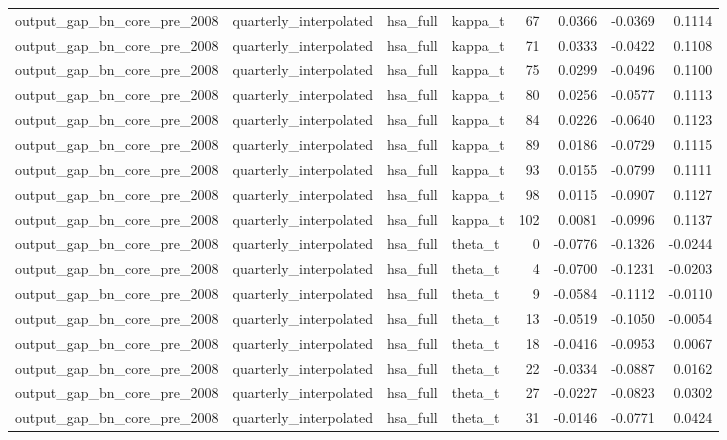 \begin{tabular}{llllrrrr}
output\_gap\_bn\_core\_pre\_2008 & quarterly\_interpolated & hsa\_full & kappa\_t & 67 & 0.0366 & -0.0369 & 0.1114 \\
output\_gap\_bn\_core\_pre\_2008 & quarterly\_interpolated & hsa\_full & kappa\_t & 71 & 0.0333 & -0.0422 & 0.1108 \\
output\_gap\_bn\_core\_pre\_2008 & quarterly\_interpolated & hsa\_full & kappa\_t & 75 & 0.0299 & -0.0496 & 0.1100 \\
output\_gap\_bn\_core\_pre\_2008 & quarterly\_interpolated & hsa\_full & kappa\_t & 80 & 0.0256 & -0.0577 & 0.1113 \\
output\_gap\_bn\_core\_pre\_2008 & quarterly\_interpolated & hsa\_full & kappa\_t & 84 & 0.0226 & -0.0640 & 0.1123 \\
output\_gap\_bn\_core\_pre\_2008 & quarterly\_interpolated & hsa\_full & kappa\_t & 89 & 0.0186 & -0.0729 & 0.1115 \\
output\_gap\_bn\_core\_pre\_2008 & quarterly\_interpolated & hsa\_full & kappa\_t & 93 & 0.0155 & -0.0799 & 0.1111 \\
output\_gap\_bn\_core\_pre\_2008 & quarterly\_interpolated & hsa\_full & kappa\_t & 98 & 0.0115 & -0.0907 & 0.1127 \\
output\_gap\_bn\_core\_pre\_2008 & quarterly\_interpolated & hsa\_full & kappa\_t & 102 & 0.0081 & -0.0996 & 0.1137 \\
output\_gap\_bn\_core\_pre\_2008 & quarterly\_interpolated & hsa\_full & theta\_t & 0 & -0.0776 & -0.1326 & -0.0244 \\
output\_gap\_bn\_core\_pre\_2008 & quarterly\_interpolated & hsa\_full & theta\_t & 4 & -0.0700 & -0.1231 & -0.0203 \\
output\_gap\_bn\_core\_pre\_2008 & quarterly\_interpolated & hsa\_full & theta\_t & 9 & -0.0584 & -0.1112 & -0.0110 \\
output\_gap\_bn\_core\_pre\_2008 & quarterly\_interpolated & hsa\_full & theta\_t & 13 & -0.0519 & -0.1050 & -0.0054 \\
output\_gap\_bn\_core\_pre\_2008 & quarterly\_interpolated & hsa\_full & theta\_t & 18 & -0.0416 & -0.0953 & 0.0067 \\
output\_gap\_bn\_core\_pre\_2008 & quarterly\_interpolated & hsa\_full & theta\_t & 22 & -0.0334 & -0.0887 & 0.0162 \\
output\_gap\_bn\_core\_pre\_2008 & quarterly\_interpolated & hsa\_full & theta\_t & 27 & -0.0227 & -0.0823 & 0.0302 \\
output\_gap\_bn\_core\_pre\_2008 & quarterly\_interpolated & hsa\_full & theta\_t & 31 & -0.0146 & -0.0771 & 0.0424 \\

\end{tabular}
